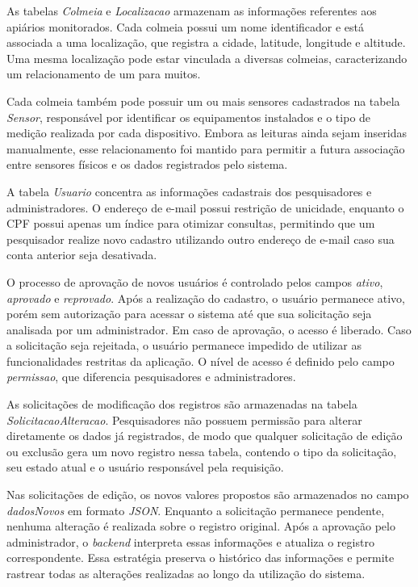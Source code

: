 \documentclass[12pt]{unisenaiclass}
\begin{document}
As tabelas \textit{Colmeia} e \textit{Localizacao} armazenam as informações referentes aos apiários monitorados. Cada colmeia possui um nome identificador e está associada a uma localização, que registra a cidade, latitude, longitude e altitude. Uma mesma localização pode estar vinculada a diversas colmeias, caracterizando um relacionamento de um para muitos.

Cada colmeia também pode possuir um ou mais sensores cadastrados na tabela \textit{Sensor}, responsável por identificar os equipamentos instalados e o tipo de medição realizada por cada dispositivo. Embora as leituras ainda sejam inseridas manualmente, esse relacionamento foi mantido para permitir a futura associação entre sensores físicos e os dados registrados pelo sistema.

A tabela \textit{Usuario} concentra as informações cadastrais dos pesquisadores e administradores. O endereço de e-mail possui restrição de unicidade, enquanto o CPF possui apenas um índice para otimizar consultas, permitindo que um pesquisador realize novo cadastro utilizando outro endereço de e-mail caso sua conta anterior seja desativada.

O processo de aprovação de novos usuários é controlado pelos campos \textit{ativo}, \textit{aprovado} e \textit{reprovado}. Após a realização do cadastro, o usuário permanece ativo, porém sem autorização para acessar o sistema até que sua solicitação seja analisada por um administrador. Em caso de aprovação, o acesso é liberado. Caso a solicitação seja rejeitada, o usuário permanece impedido de utilizar as funcionalidades restritas da aplicação. O nível de acesso é definido pelo campo \textit{permissao}, que diferencia pesquisadores e administradores.

As solicitações de modificação dos registros são armazenadas na tabela \textit{SolicitacaoAlteracao}. Pesquisadores não possuem permissão para alterar diretamente os dados já registrados, de modo que qualquer solicitação de edição ou exclusão gera um novo registro nessa tabela, contendo o tipo da solicitação, seu estado atual e o usuário responsável pela requisição.

Nas solicitações de edição, os novos valores propostos são armazenados no campo \textit{dadosNovos} em formato \textit{JSON}. Enquanto a solicitação permanece pendente, nenhuma alteração é realizada sobre o registro original. Após a aprovação pelo administrador, o \textit{backend} interpreta essas informações e atualiza o registro correspondente. Essa estratégia preserva o histórico das informações e permite rastrear todas as alterações realizadas ao longo da utilização do sistema.
\end{document}
